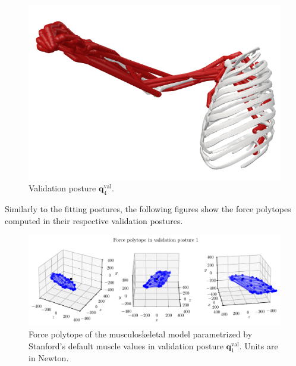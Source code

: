\begin{figure}[!htb]
\begin{minipage}{0.3\linewidth}
        \centering
        \includegraphics[trim={0 0 0 0}, clip, width=0.9\linewidth]{img/chapter_4/pose_10_side.png}
    \end{minipage}
    \caption{Validation posture $\mathbf{q}_4^{\text{val}}$.}
    \label{fig:pose_val_4}
\end{figure}

Similarly to the fitting postures, the following figures show the force polytopes computed in their respective validation postures.

\begin{figure}[!htb]
    \centering
    \captionsetup{justification=centering}
    \begin{minipage}{\linewidth}
        \centering
        \includegraphics[trim={0 0 0 0}, clip, width=1\linewidth]{img/chapter_4/reconstruction_stanford_imgs/STANFORD_POSTURE_VAL_01.pdf}
    \end{minipage}
    \caption{Force polytope of the musculoskeletal model parametrized by Stanford's default muscle values in validation posture $\mathbf{q}_1^{\text{val}}$. Units are in Newton.}
    \label{fig:polytope_val_pose_1}
\end{figure}

